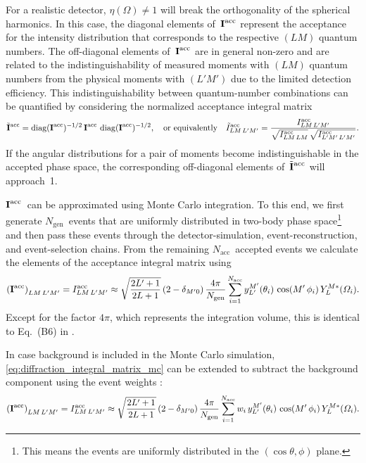 For a realistic detector, $\eta(\Omega) \neq 1$ will break the
orthogonality of the spherical harmonics.  In this case, the diagonal
elements of~$\bm{\mathrm{I}}^\text{acc}$ represent the acceptance for the
intensity distribution that corresponds to the respective $(L M)$
quantum numbers.  The off-diagonal elements of~$\bm{\mathrm{I}}^\text{acc}$
are in general non-zero and are related to the indistinguishability of
measured moments with $(L M)$ quantum numbers from the physical
moments with $(L' M')$ due to the limited detection efficiency.  This
indistinguishability between quantum-number combinations can be
quantified by considering the normalized acceptance integral matrix
\begin{equation}
  \tilde{\bm{\mathrm{I}}}^\text{acc}
  = \operatorname{diag}(\bm{\mathrm{I}}^\text{acc})^{-1/2}\, \bm{\mathrm{I}}^\text{acc}\, \operatorname{diag}(\bm{\mathrm{I}}^\text{acc})^{-1/2},
  \quad\text{or equivalently}\quad
  \tilde{I}^\text{acc}_{L M\, L' M'}
  = \frac{I^\text{acc}_{L M\, L' M'}}{\sqrt{I^\text{acc}_{L M\, L M}}\, \sqrt{I^\text{acc}_{L' M'\, L' M'}}}.
\end{equation}
If the angular distributions for a pair of moments become
indistinguishable in the accepted phase space, the corresponding
off-diagonal elements of~$\tilde{\bm{\mathrm{I}}}^\text{acc}$ will approach~1.

$\bm{\mathrm{I}}^\text{acc}$~can be approximated using Monte Carlo
integration.  To this end, we first generate $N_\text{gen}$~events
that are uniformly distributed in two-body phase space\footnote{This
means the events are uniformly distributed in the $(\cos\theta, \phi)$
plane.} and then pass these events through the detector-simulation,
event-reconstruction, and event-selection chains.  From the remaining
$N_\text{acc}$~accepted events we calculate the elements of the
acceptance integral matrix using
\begin{equation}
  \label{eq:diffraction_integral_matrix_mc}
  \rBrk{\mat{I}^\text{acc}}_{L M\, L' M'}
  = I^\text{acc}_{L M\, L' M'}
  \approx \sqrt{\frac{2 L' + 1}{2 L + 1}}\, (2 - \delta_{M' 0})\,
  \frac{4 \pi}{N_\text{gen}} \sum_{i = 1}^{N_\text{acc}} y_{L'}^{M'}(\theta_i)\, \cos(M'\, \phi_i)\, Y_L^{M *}(\Omega_i).
\end{equation}
Except for the factor $4 \pi$, which represents the integration
volume, this is identical to Eq.~(B6) in .

In case background is included in the Monte Carlo simulation,
\cref{eq:diffraction_integral_matrix_mc} can be extended to subtract the
background component using the event weights :
\begin{equation}
  \label{eq:diffraction_integral_matrix_mc_weighted}
  \rBrk{\mat{I}^\text{acc}}_{L M\, L' M'}
  = I^\text{acc}_{L M\, L' M'}
  \approx \sqrt{\frac{2 L' + 1}{2 L + 1}}\, (2 - \delta_{M' 0})\,
  \frac{4 \pi}{N_\text{gen}} \sum_{i = 1}^{N_\text{acc}} w_i\, y_{L'}^{M'}(\theta_i)\, \cos(M'\, \phi_i)\, Y_L^{M *}(\Omega_i).
\end{equation}

